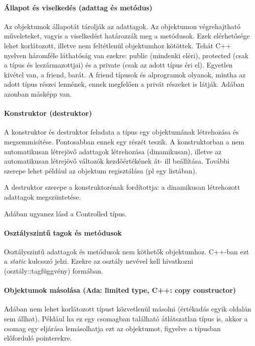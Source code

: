 \documentclass[fleqn,10pt,a4paper]{article}
\theoremstyle{magyar}
\begin{document}
  \paragraph{Állapot és viselkedés (adattag és metódus)}
  Az objektumok állapotát tárolják az adattagok. Az objektumon
  végrehajtható műveleteket, vagyis a viselkedést határozzák meg a
  metódusok. Ezek elérhetősége lehet korlátozott, illetve nem
  feltétlenül objektumhoz kötöttek. Tehát C++ nyelven háromféle
  láthatóság van ezekre: public (mindenki eléri), protected (csak a
  típus és leszármazottjai) és a private (csak az adott típus éri el).
  Egyetlen kivétel van, a friend, barát. A friend típusok és
  alprogramok olyanok, mintha az adott típus részei lennének, ennek
  megfelően a privát részeket is látják.
  Adában azonban másképp van.
  
  \paragraph{Konstruktor (destruktor)}
  A konstruktor és destruktor feladata a típus egy objektumának
  létrehozása és megsemmisítése. Pontosabban ennek egy részét
  teszik. A konstruktorban a nem automatikusan létrejövő adattagok
  létrehozása (dinamikusan), illetve az automatikusan létrejövő
  változók kezdőértékének át- ill beállítása. További szerepe lehet
  például az objektum regisztálása (pl egy listában).

  A destruktor szerepe a konstruktorénak fordítottja: a dinamikusan
  létrehozott adattagok megszüntetése.

  Adában ugyanez lásd a Controlled típus.

  \paragraph{Osztályszintű tagok és metódusok}
  Osztályszintű adattagok és metódusok nem köthetők
  objektumhoz. C++-ban ezt a \emph{static} kulcsszó jelzi. Ezekre az
  osztály nevével kell hivatkozni (osztály::tagfüggvény) formában.
  
  \paragraph{Objektumok másolása (Ada: limited type, C++: copy
    constructor)}
  Adában nem lehet korlátozott típust közvetlenül másolni (értékadás
  egyik oldalán sem állhat). Például ha ez egy csomagban található
  átlátszatlan típus is, akkor a csomag egy eljárása lemásolhatja ezt
  az objektumot, figyelve a típusban előforduló pointerekre.
\end{document}
